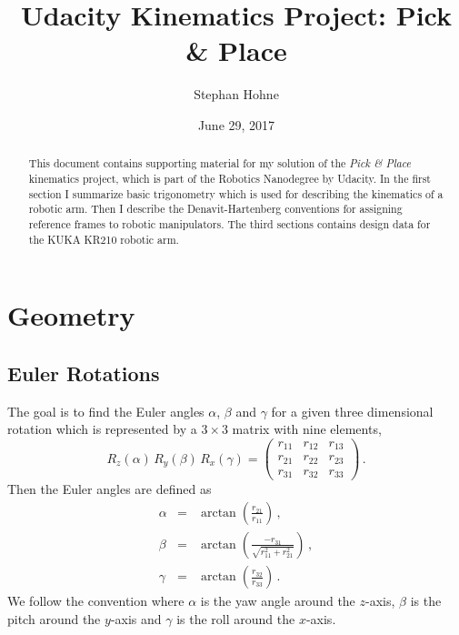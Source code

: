 \documentclass[11pt, onecolumn, oneside, reqno]{article}
\title{Udacity Kinematics Project: Pick \& Place}
\author{Stephan Hohne}
\date{June 29, 2017}
\begin{document}
\maketitle

\begin{abstract}
This document contains supporting material for my solution of the \emph{Pick \& Place} kinematics project, which is part of the Robotics Nanodegree by Udacity. In the first section I summarize basic trigonometry which is used for describing the kinematics of a robotic arm. Then I describe the Denavit-Hartenberg conventions for assigning reference frames to robotic manipulators. The third sections contains design data for the KUKA KR210 robotic arm.
\end{abstract}

\tableofcontents

\listoftables

\newpage

\section{Geometry}
\subsection{Euler Rotations}
The goal is to find the Euler angles $\alpha$, $\beta$ and $\gamma$ for a given three dimensional rotation which is represented by a $3 \times 3$ matrix with nine elements,
\begin{equation}
R_z \left(\alpha \right) \, R_y \left(\beta \right) \, R_x \left(\gamma \right) =
\begin{pmatrix}
r_{11} & r_{12} & r_{13} \\
r_{21} & r_{22} & r_{23} \\
r_{31} & r_{32} & r_{33}
\end{pmatrix} \, .
\end{equation}
Then the Euler angles are defined as
\begin{eqnarray}
\alpha & = & \arctan \left( \frac{r_{21}}{r_{11}} \right) \, , \\
\beta & = & \arctan \left( \frac{-r_{31}}{\sqrt{r_{11}^2 + r_{21}^2}} \right) \, , \\
\gamma & = & \arctan \left( \frac{r_{32}}{r_{33}} \right) \, .
\end{eqnarray}
We follow the convention where $\alpha$ is the yaw angle around the $z$-axis, $\beta$ is the pitch around the $y$-axis and $\gamma$ is the roll around the $x$-axis.
\end{document}
